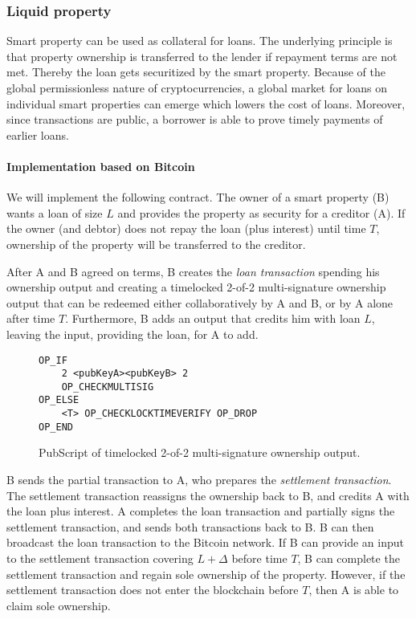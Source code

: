 \subsubsection{Liquid property}

Smart property can be used as collateral for loans. The underlying principle is that property ownership is transferred to the lender if repayment terms are not met. Thereby the loan gets securitized by the smart property. Because of the global permissionless nature of cryptocurrencies, a global market for loans on individual smart properties can emerge which lowers the cost of loans. Moreover, since transactions are public, a borrower is able to prove timely payments of earlier loans. 

\paragraph{Implementation based on Bitcoin}

We will implement the following contract. The owner of a smart property (B) wants a loan of size $L$ and provides the property as security for a creditor (A). If the owner (and debtor) does not repay the loan (plus interest) until time $T$, ownership of the property will be transferred to the creditor.

After A and B agreed on terms, B creates the \emph{loan transaction} spending his ownership output and creating a timelocked 2-of-2 multi-signature ownership output that can be redeemed either collaboratively by A and B, or by A alone after time $T$. Furthermore, B adds an output that credits him with loan $L$, leaving the input, providing the loan, for A to add. 
\begin{figure}
\begin{lstlisting}
OP_IF 
    2 <pubKeyA><pubKeyB> 2
    OP_CHECKMULTISIG
OP_ELSE
    <T> OP_CHECKLOCKTIMEVERIFY OP_DROP
OP_END    
\end{lstlisting}
\caption{PubScript of timelocked 2-of-2 multi-signature ownership output.}
\end{figure}

B sends the partial transaction to A, who prepares the \emph{settlement transaction}. The settlement transaction reassigns the ownership back to B, and credits A with the loan plus interest. A completes the loan transaction and partially signs the settlement transaction, and sends both transactions back to B. B can then broadcast the loan transaction to the Bitcoin network. 
If B can provide an input to the settlement transaction covering $L+\Delta$ before time $T$, B can complete the settlement transaction and regain sole ownership of the property. However, if the settlement transaction does not enter the blockchain before $T$, then A is able to claim sole ownership.

